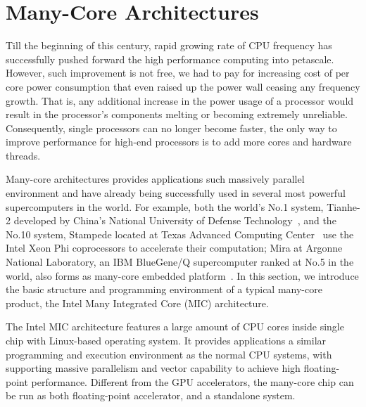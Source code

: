 \section{Many-Core Architectures}\label{sec:back-manycore}
Till the beginning of this century, rapid growing rate of CPU frequency
has successfully pushed forward the high performance computing into
petascale. However, such improvement is not free, we had to pay for
increasing cost of per core power consumption that even raised up the
power wall ceasing any frequency growth. That is, any additional increase
in the power usage of a processor would result in the processor's components
melting or becoming extremely unreliable. Consequently, single processors
can no longer become faster, the only way to improve performance for
high-end processors is to add more cores and hardware threads.

Many-core architectures provides applications such massively parallel
environment and have already being successfully used in several most
powerful supercomputers in the world. For example, both the world's No.1 system,
Tianhe-2 developed by China's National University of Defense
Technology~\cite{tianhe2}, and the No.10 system, Stampede located at Texas
Advanced Computing Center~\cite{stampede} use the Intel Xeon Phi coprocessors
to accelerate their computation; Mira at Argonne National Laboratory, an IBM
BlueGene/Q supercomputer ranked at No.5 in the world, also forms as
many-core embedded platform~\cite{mira}.
In this section, we introduce the basic structure and programming
environment of a typical many-core product, the Intel Many Integrated
Core (MIC) architecture.


The Intel MIC architecture features a large amount
of CPU cores inside single chip with Linux-based operating system. It
provides applications a similar programming and execution environment
as the normal CPU systems, with supporting massive parallelism and vector
capability to achieve high floating-point performance. Different from
the GPU accelerators, the many-core chip can be run as both floating-point
accelerator, and a standalone system.

